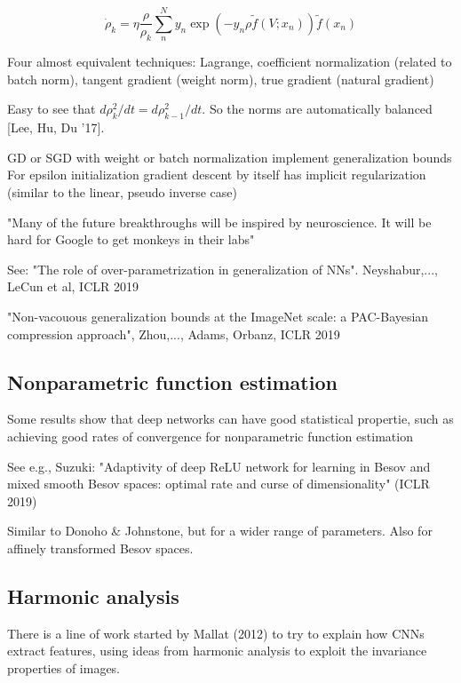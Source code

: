 \documentclass[english]{article}
\begin{document}
$$
\dot \rho_k 
= 
\eta
\frac{\rho}{\rho_k}
\sum_n^N y_n\exp(-y_n\rho \tilde f(V;x_n))
\tilde f(x_n)
$$

Four almost equivalent techniques: Lagrange, coefficient normalization (related to batch norm), tangent gradient (weight norm), true gradient (natural gradient)

Easy to see that $d\rho_k^2/dt = d\rho_{k-1}^2/dt$. So the norms are automatically balanced [Lee, Hu, Du '17]. 

GD or SGD with weight or batch normalization implement generalization bounds For epsilon initialization gradient descent by itself has implicit regularization (similar to the linear, pseudo inverse case)

"Many of the future breakthroughs will be inspired by neuroscience. It will be hard for Google to get monkeys in their labs"

\eenum

\item See: "The role of over-parametrization in generalization of NNs". Neyshabur,..., LeCun et al, ICLR 2019

"Non-vacouous generalization bounds at the ImageNet scale: a PAC-Bayesian compression approach", Zhou,..., Adams, Orbanz, ICLR 2019
\eenum



\subsection{Nonparametric function estimation}


\benum
\item Some results show that deep networks can have good statistical propertie, such as achieving good rates of convergence for nonparametric function estimation

See e.g., Suzuki: "Adaptivity of deep ReLU network for learning in Besov and mixed smooth Besov spaces: optimal rate and curse of dimensionality" (ICLR 2019)

Similar to Donoho \& Johnstone, but for a wider range of parameters. Also for affinely transformed Besov spaces.

\eenum 

\subsection{Harmonic analysis}

There is a line of work started by Mallat (2012) to try to explain how CNNs extract features, using ideas from harmonic analysis to exploit the invariance properties of images. 
\end{document}
